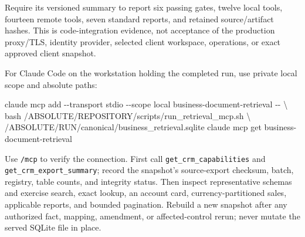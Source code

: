 \documentclass[
]{article}
\newenvironment{Shaded}{}{}
\newcommand{\AttributeTok}[1]{\textcolor[rgb]{0.49,0.56,0.16}{#1}}
\newcommand{\DataTypeTok}[1]{\textcolor[rgb]{0.56,0.13,0.00}{#1}}
\newcommand{\ExtensionTok}[1]{#1}
\newcommand{\NormalTok}[1]{#1}
\begin{document}
Require its versioned summary to report six passing gates, twelve local
tools, fourteen remote tools, seven standard reports, and retained
source/artifact hashes. This is code-integration evidence, not
acceptance of the production proxy/TLS, identity provider, selected
client workspace, operations, or exact approved client snapshot.

For Claude Code on the workstation holding the completed run, use
private local scope and absolute paths:

\begin{Shaded}
\begin{Highlighting}[]
\ExtensionTok{claude}\NormalTok{ mcp add }\AttributeTok{{-}{-}transport}\NormalTok{ stdio }\AttributeTok{{-}{-}scope}\NormalTok{ local business{-}document{-}retrieval }\AttributeTok{{-}{-}} \DataTypeTok{\textbackslash{}}
\NormalTok{  bash /ABSOLUTE/REPOSITORY/scripts/run\_retrieval\_mcp.sh }\DataTypeTok{\textbackslash{}}
\NormalTok{  /ABSOLUTE/RUN/canonical/business\_retrieval.sqlite}
\ExtensionTok{claude}\NormalTok{ mcp get business{-}document{-}retrieval}
\end{Highlighting}
\end{Shaded}

Use \texttt{/\allowbreak{}mcp} to verify the connection. First call
\texttt{get\_\allowbreak{}crm\_\allowbreak{}capabilities} and
\texttt{get\_\allowbreak{}crm\_\allowbreak{}export\_\allowbreak{}summary};
record the snapshot's source-export checksum, batch, registry, table
counts, and integrity status. Then inspect representative schemas and
exercise search, exact lookup, an account card, currency-partitioned
sales, applicable reports, and bounded pagination. Rebuild a new
snapshot after any authorized fact, mapping, amendment, or
affected-control rerun; never mutate the served SQLite file in place.
\end{document}
